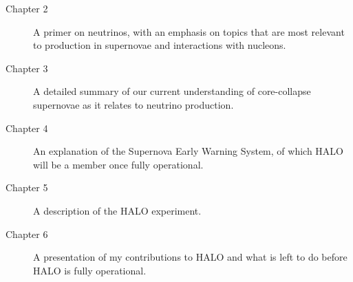 	\begin{description}
		\item[Chapter 2] A primer on neutrinos, with an emphasis on topics that are most relevant to production in supernovae and interactions with nucleons.
		\item[Chapter 3] A detailed summary of our current understanding of core-collapse supernovae as it relates to neutrino production. 
		\item[Chapter 4] An explanation of the Supernova Early Warning System, of which HALO will be a member once fully operational.
		\item[Chapter 5] A description of the HALO experiment.
		\item[Chapter 6] A presentation of my contributions to HALO and what is left to do before HALO is fully operational.
 	\end{description}



